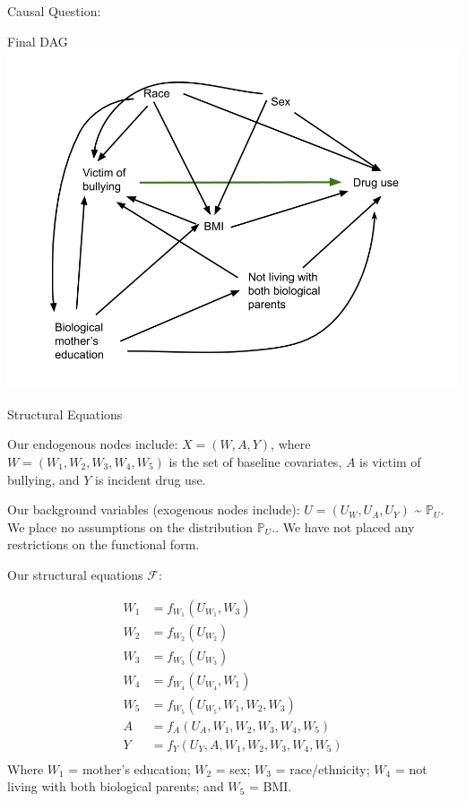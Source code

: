 \documentclass[ignorenonframetext,]{beamer}
\begin{document}
\begin{frame}{Causal Question:}
\begin{block}{Final DAG}
\includegraphics[width=1\linewidth]{DAG Causal Final Project_reduced covariates}

\end{block}

\begin{block}{Structural Equations}

Our endogenous nodes include: \(X = (W, A, Y)\), where
\(W = (W_1, W_2, W_3, W_4, W_5)\) is the set of baseline covariates,
\(A\) is victim of bullying, and \(Y\) is incident drug use.

Our background variables (exogenous nodes include):
\(U = (U_W, U_A, U_Y)\) \textasciitilde{} \(\mathbb{P}_U\). We place no
assumptions on the distribution \(\mathbb{P}_U\).. We have not placed
any restrictions on the functional form.

Our structural equations \(\mathcal{F}\):

\[
\begin{aligned}
W_1 &= f_{W_1} (U_{W_1}, W_3) \\
W_2  &= f_{W_2}  (U_{W_2}) \\
W_3  &= f_{W_3}  (U_{W_3}) \\
W_4  &= f_{W_4} (U_{W_4}, W_1) \\
W_5  &= f_{W_5} (U_{W_5}, W_1, W_2, W_3) \\
A &= f_A (U_A, W_1, W_2, W_3, W_4, W_5) \\
Y &= f_Y (U_Y, A, W_1, W_2, W_3, W_4, W_5) \\
\end{aligned}
\] Where \(W_1\) = mother's education; \(W_2\) = sex; \(W_3\) =
race/ethnicity; \(W_4\) = not living with both biological parents; and
\(W_5\) = BMI.


\end{block}
\end{frame}
\end{document}
